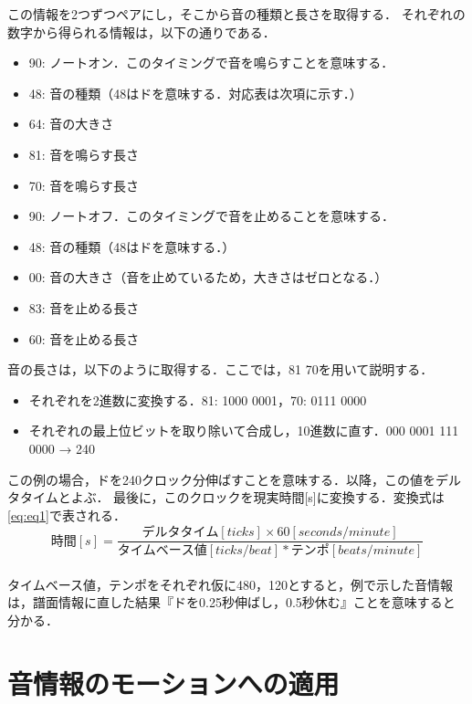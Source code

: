 この情報を2つずつペアにし，そこから音の種類と長さを取得する．
それぞれの数字から得られる情報は，以下の通りである．
\newpage
\begin{itemize}
	\item 90: ノートオン．このタイミングで音を鳴らすことを意味する．
	\item 48: 音の種類（48はドを意味する．対応表は次項に示す．）
	\item 64: 音の大きさ
	\item 81: 音を鳴らす長さ
	\item 70: 音を鳴らす長さ
	\item 90: ノートオフ．このタイミングで音を止めることを意味する．
	\item 48: 音の種類（48はドを意味する．）
	\item 00: 音の大きさ（音を止めているため，大きさはゼロとなる．）
	\item 83: 音を止める長さ
	\item 60: 音を止める長さ
\end{itemize}
\vspace{5mm}
音の長さは，以下のように取得する．ここでは，81 70を用いて説明する．
\begin{itemize}
	\item それぞれを2進数に変換する．\hspace{1mm}81: 1000 0001，70: 0111 0000
	\item それぞれの最上位ビットを取り除いて合成し，10進数に直す．\hspace{1mm}000 0001 111 0000 → 240
\end{itemize}
\vspace{5mm}
この例の場合，ドを240クロック分伸ばすことを意味する．以降，この値をデルタタイムとよぶ．
最後に，このクロックを現実時間[s]に変換する．変換式は\eqref{eq:eq1}で表される．\\
\begin{equation}
\label{eq:eq1}
時間[s] = 
\frac {デルタタイム[ticks] × 60[seconds/minute]}{タイムベース値[ticks/beat] * テンポ[beats/minute]}
\end{equation}
\\
タイムベース値，テンポをそれぞれ仮に480，120とすると，例で示した音情報は，譜面情報に直した結果『ドを0.25秒伸ばし，0.5秒休む』ことを意味すると分かる．
\newpage
\section{音情報のモーションへの適用} \label{sec:adapt}
